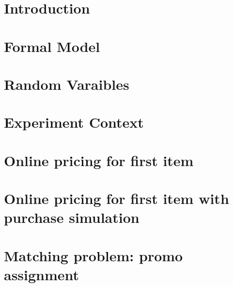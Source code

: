 
\usepackage{amsfonts}
\usepackage{amsmath}
\DeclareMathOperator{\argmax}{arg\,max}

	
	\tableofcontents
    \clearpage
	\section*{Introduction}
    \label{sect:Introduction}
		
    \section*{Formal Model}
    \label{sect:Formal Model}
		
    \section*{Random Varaibles}
    \label{sect:Random Variables}
		
    \section*{Experiment Context}
    \label{sect:Experiment Context}
		
    \section*{Online pricing for first item}
    \label{sect:Online pricing for first item}
		
    \section*{Online pricing for first item with purchase simulation}
    \label{sect:Online pricing for first item with purchase simulation}
		
    \section*{Matching problem: promo assignment}
    \label{sect:Matching problem: promo assignment}
		
